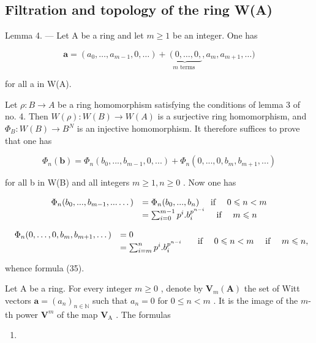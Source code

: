 \subsection{Filtration and topology of the ring W(A)}

Lemma 4. --- Let A be a ring and let \(m \geqslant 1\) be an integer. One has

\[
\boldsymbol {a} = \left(a _ {0}, \dots , a _ {m - 1}, 0, \dots\right) + \underbrace {\left(0 , \dots , 0 , \right.} _ {m \text { terms }}, a _ {m}, a _ {m + 1}, \dots)\tag{34}
\]

for all a in W(A).

Let \(\rho: B \to A\) be a ring homomorphism satisfying the conditions of lemma 3 of no. 4. Then \(W(\rho): W(B) \to W(A)\) is a surjective ring homomorphism, and \(\Phi_B: W(B) \to B^N\) is an injective homomorphism. It therefore suffices to prove that one has

\[
\Phi_ {n} (\boldsymbol {b}) = \Phi_ {n} (b _ {0},..., b _ {m - 1}, 0,...) + \Phi_ {n} (0,..., 0, b _ {m}, b _ {m + 1},...) \tag{35}
\]

for all b in W(B) and all integers \(m \geqslant 1, n \geqslant 0\) . Now one has

\[
\begin{array}{r l} \Phi_ {n} (b _ {0},..., b _ {m - 1},... \dots) & = \Phi_ {n} (b _ {0},..., b _ {n}) \quad \text { if } \quad 0 \leqslant n <   m \\ & = \sum_ {i = 0} ^ {m - 1} p ^ {i}. b _ {i} ^ {p ^ {n - i}} \quad \text { if } \quad m \leqslant n \end{array}
\]

\[
\begin{array}{r l} \Phi_ {n} (0, \dots , 0, b _ {m}, b _ {m + 1}, \dots) & = 0 \\ & = \sum_ {i = m} ^ {n} p ^ {i}. b _ {i} ^ {p ^ {n - i}} \end{array} \quad \text { if } \quad 0 \leqslant n <   m \quad \text { if } \quad m \leqslant n,
\]

whence formula (35).

Let A be a ring. For every integer \(m \geqslant 0\) , denote by \(\mathbf{V}_{m}(\mathbf{A})\) the set of Witt vectors \(\boldsymbol{a} = (a_{n})_{n \in \mathbb{N}}\) such that \(a_{n} = 0\) for \(0 \leqslant n < m\) . It is the image of the \(m\)-th power \(\mathbf{V}^{m}\) of the map \(\mathbf{V}_{\mathrm{A}}\) . The formulas

\begin{enumerate}
\def\labelenumi{(\arabic{enumi})}
\setcounter{enumi}{35}
\tightlist
\item
\end{enumerate}


